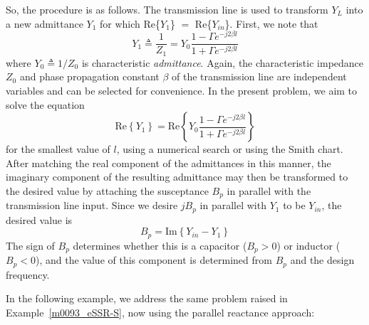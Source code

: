 So, the procedure is as follows.
The transmission line is used to transform $Y_L$ into a new admittance $Y_1$ for which Re\{$Y_1$\} $=$ Re\{$Y_{in}$\}.
First, we note that
%
\begin{equation}
Y_1 \triangleq \frac{1}{Z_1} = Y_0 \frac{ 1 - \Gamma e^{-j2\beta l} }{ 1 + \Gamma e^{-j2\beta l} }
\end{equation}
%
where $Y_0 \triangleq 1/Z_0$ is characteristic \emph{admittance}.
Again, the characteristic impedance $Z_0$ 
and phase propagation constant $\beta$ 
of the transmission line are independent variables and can be selected for convenience.
In the present problem, we aim to solve the equation
%
\begin{equation}
\mbox{Re}\left\{Y_1\right\} = \mbox{Re}\left\{Y_0 \frac{ 1 - \Gamma e^{-j2\beta l} }{ 1 + \Gamma e^{-j2\beta l} }\right\}
\end{equation}
%
for the smallest value of $l$, using a numerical search or using the Smith chart.
After matching the real component of the admittances in this manner, the imaginary component of the resulting admittance may then be transformed to the desired value by attaching the susceptance $B_p$ in parallel with the transmission line input. 
Since we desire $jB_p$ in parallel with $Y_1$ to be $Y_{in}$, the desired value is
%
\begin{equation}
B_p = \mbox{Im}\left\{Y_{in}-Y_1\right\}
\end{equation}
%
The sign of $B_p$ determines whether this is a capacitor ($B_p>0$) or inductor ($B_p<0$), and the value of this component is determined from $B_p$ and the design frequency.

In the following example, we address the same problem raised in Example~\ref{m0093_eSSR-S}, now using the parallel reactance approach:

